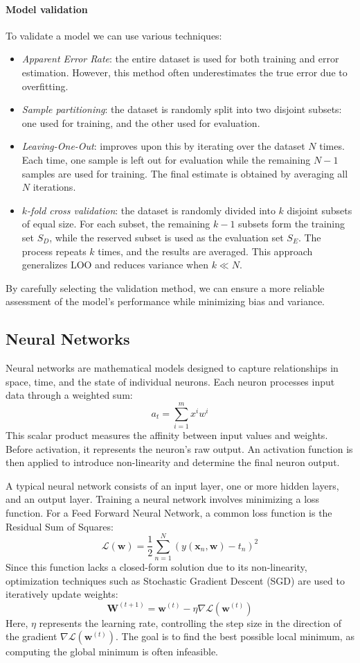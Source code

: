 \paragraph*{Model validation}
To validate a model we can use various techniques: 
\begin{itemize}
    \item \textit{Apparent Error Rate}: the entire dataset is used for both training and error estimation. However, this method often underestimates the true error due to overfitting.  
    \item \textit{Sample partitioning}: the dataset is randomly split into two disjoint subsets: one used for training, and the other used for evaluation.  
    \item \textit{Leaving-One-Out}: improves upon this by iterating over the dataset $N$ times. 
        Each time, one sample is left out for evaluation while the remaining $N-1$ samples are used for training. 
        The final estimate is obtained by averaging all $N$ iterations.  
    \item \textit{$k$-fold cross validation}: the dataset is randomly divided into $k$ disjoint subsets of equal size. 
        For each subset, the remaining $k-1$ subsets form the training set $S_D$, while the reserved subset is used as the evaluation set $S_E$. 
        The process repeats $k$ times, and the results are averaged. This approach generalizes LOO and reduces variance when $k \ll N$.  
\end{itemize}
\noindent By carefully selecting the validation method, we can ensure a more reliable assessment of the model’s performance while minimizing bias and variance.

\subsection{Neural Networks}
Neural networks are mathematical models designed to capture relationships in space, time, and the state of individual neurons. 
Each neuron processes input data through a weighted sum:
\[a_t=\sum_{i=1}^{m}x^iw^i\]
\noindent This scalar product measures the affinity between input values and weights. 
Before activation, it represents the neuron's raw output. An activation function is then applied to introduce non-linearity and determine the final neuron output.

A typical neural network consists of an input layer, one or more hidden layers, and an output layer.
Training a neural network involves minimizing a loss function. 
For a Feed Forward Neural Network, a common loss function is the Residual Sum of Squares:
\[\mathcal{L}(\mathbf{w})=\dfrac{1}{2}\sum_{n=1}^{N}\left(y(\mathbf{x}_n,\mathbf{w})-t_n\right)^2\]
Since this function lacks a closed-form solution due to its non-linearity, optimization techniques such as Stochastic Gradient Descent (SGD) are used to iteratively update weights:
\[\mathbf{W}^{(t+1)}=\mathbf{w}^{(t)}-\eta\nabla\mathcal{L}(\mathbf{w}^{(t)})\]
\noindent Here, $\eta$ represents the learning rate, controlling the step size in the direction of the gradient $\nabla\mathcal{L}(\mathbf{w}^{(t)})$. 
The goal is to find the best possible local minimum, as computing the global minimum is often infeasible.

